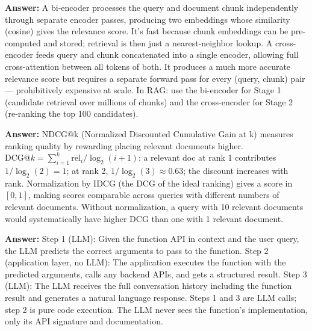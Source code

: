 \documentclass[11pt, a4paper]{article}
\begin{document}
\begin{notebox}
\textbf{Answer:} A bi-encoder processes the query and document chunk independently through separate encoder passes, producing two embeddings whose similarity (cosine) gives the relevance score. It's fast because chunk embeddings can be pre-computed and stored; retrieval is then just a nearest-neighbor lookup. A cross-encoder feeds query and chunk concatenated into a single encoder, allowing full cross-attention between all tokens of both. It produces a much more accurate relevance score but requires a separate forward pass for every (query, chunk) pair --- prohibitively expensive at scale. In RAG: use the bi-encoder for Stage 1 (candidate retrieval over millions of chunks) and the cross-encoder for Stage 2 (re-ranking the top 100 candidates).
\end{notebox}

\begin{notebox}
\textbf{Answer:} NDCG@k (Normalized Discounted Cumulative Gain at k) measures ranking quality by rewarding placing relevant documents higher. $\text{DCG@}k = \sum_{i=1}^k \text{rel}_i / \log_2(i+1)$: a relevant doc at rank 1 contributes $1/\log_2(2) = 1$; at rank 2, $1/\log_2(3) \approx 0.63$; the discount increases with rank. Normalization by IDCG (the DCG of the ideal ranking) gives a score in $[0,1]$, making scores comparable across queries with different numbers of relevant documents. Without normalization, a query with 10 relevant documents would systematically have higher DCG than one with 1 relevant document.
\end{notebox}

\begin{notebox}
\textbf{Answer:} Step 1 (LLM): Given the function API in context and the user query, the LLM predicts the correct arguments to pass to the function. Step 2 (application layer, no LLM): The application executes the function with the predicted arguments, calls any backend APIs, and gets a structured result. Step 3 (LLM): The LLM receives the full conversation history including the function result and generates a natural language response. Steps 1 and 3 are LLM calls; step 2 is pure code execution. The LLM never sees the function's implementation, only its API signature and documentation.
\end{notebox}
\end{document}
